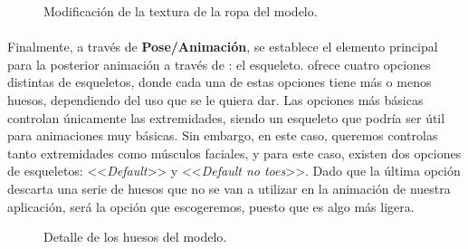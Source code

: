 \documentclass{subfiles}
\begin{document}
    \begin{figure}[H]
    \centering
    \caption{Modificación de la textura de la ropa del modelo.}
    \label{fig:4.1.tshirt_change}
    \end{figure}
    
    \paragraph{}
    Finalmente, a través de \textbf{Pose/Animación}, se establece el elemento principal para la posterior animación a través de \blender: el esqueleto. \makehuman ofrece cuatro opciones distintas de esqueletos, donde cada una de estas opciones tiene más o menos huesos, dependiendo del uso que se le quiera dar. Las opciones más básicas controlan únicamente las extremidades, siendo un esqueleto que podría ser útil para animaciones muy básicas. Sin embargo, en este caso, queremos controlas tanto extremidades como músculos faciales, y para este caso, existen dos opciones de esqueletos: <<\textit{Default}>> y <<\textit{Default no toes}>>. Dado que la última opción descarta una serie de huesos que no se van a utilizar en la animación de nuestra aplicación, será la opción que escogeremos, puesto que es algo más ligera.

    \begin{figure}[H]
    \centering
    \caption{Detalle de los huesos del modelo.}
    \label{fig:4.1.bones}
    \end{figure}
    
\end{document}
